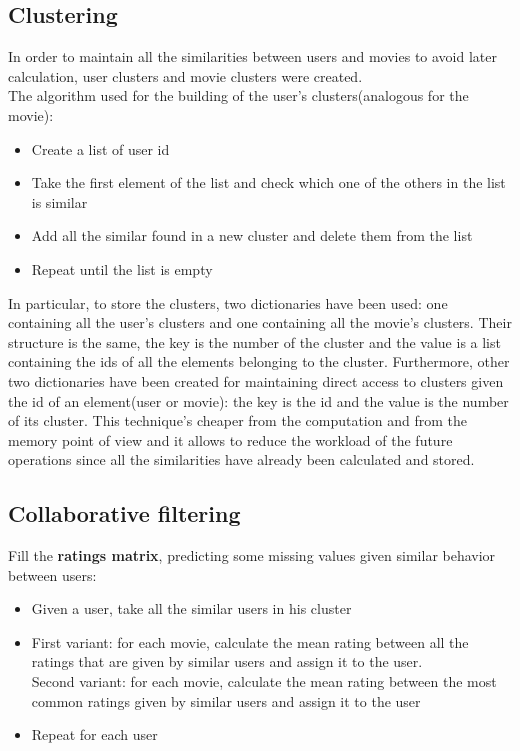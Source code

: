 \documentclass{article}
\begin{document}
\subsection{Clustering}
In order to maintain all the similarities between users and movies to avoid later calculation, user clusters and movie clusters were created.\\
The algorithm used for the building of the user's clusters(analogous for the movie):
\begin{itemize}
    \item Create a list of user id
    \item Take the first element of the list and check which one of the others in the list is similar
    \item Add all the similar found in a new cluster and delete them from the list
    \item Repeat until the list is empty
\end{itemize}

\newline
In particular, to store the clusters, two dictionaries have been used: one containing all the user's clusters and one containing all the movie's clusters. Their structure is the same, the key is the number of the cluster and the value is a list containing the ids of all the elements belonging to the cluster. Furthermore, other two dictionaries have been created for maintaining direct access to clusters given the id of an element(user or movie): the key is the id and the value is the number of its cluster. 
\newline
This technique's cheaper from the computation and from the memory point of view and it allows to reduce the workload of the future operations since all the similarities have already been calculated and stored.


\subsection{Collaborative filtering}
Fill the \textbf{ratings matrix}, predicting some missing values given similar behavior between users:
\begin{itemize}
    \item Given a user, take all the similar users in his cluster
    \item First variant: for each movie, calculate the mean rating between all the ratings that are given by similar users and assign it to the user.\\
    Second variant: for each movie, calculate the mean rating between the most common ratings given by similar users and assign it to the user
    \item Repeat for each user
\end{itemize}
\end{document}
